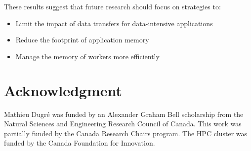 \documentclass[AMA,STIX1COL]{WileyNJD-v2}
\begin{document}
These results suggest that future research should focus on strategies to:
\begin{itemize}
	\item Limit the impact of data transfers for data-intensive applications
	\item Reduce the footprint of application memory
	\item Manage the memory of workers more efficiently
\end{itemize}
											
\section*{Acknowledgment}
Mathieu Dugr\'e was funded by an Alexander Graham Bell scholarship from
the Natural Sciences and Engineering Research Council of Canada. This work
was partially funded by the Canada Research Chairs program. The HPC cluster
was funded by the Canada Foundation for Innovation.
											


\end{document}
